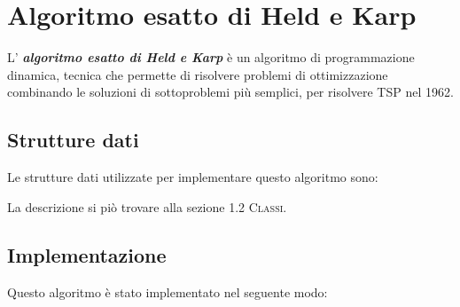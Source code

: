 \section{Algoritmo esatto di Held e Karp}
\label{algoritmoEsatto}

L' \textbf{\textit{algoritmo esatto di Held e Karp}} è un algoritmo di programmazione dinamica, tecnica che permette di risolvere problemi di ottimizzazione combinando le soluzioni di sottoproblemi più semplici, per risolvere TSP nel 1962.

\subsection{Strutture dati}
\label{struttureDati1}

Le strutture dati utilizzate per implementare questo algoritmo sono:


La descrizione si piò trovare alla sezione \textsc{1.2 Classi}.

\subsection{Implementazione}
\label{implementazione1}

Questo algoritmo è stato implementato nel seguente modo:

